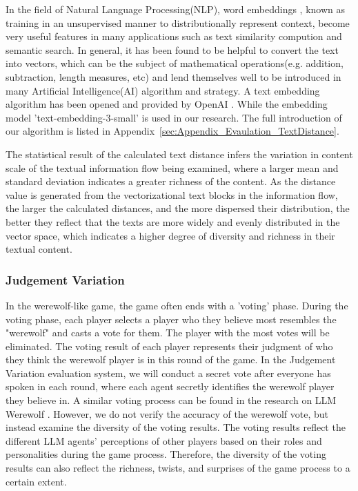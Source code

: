 \documentclass[11pt]{article}
\begin{document}
In the field of Natural Language Processing(NLP), word embeddings \citep{turian2010word,mikolov2013efficient}, known as training in an unsupervised manner to distributionally represent context, become very useful features in many applications such as text similarity compution and semantic search. In general, it has been found to be helpful to convert the text into vectors, which can be the subject of mathematical operations(e.g. addition, subtraction, length measures, etc) and lend themselves well to be introduced in many Artificial Intelligence(AI) algorithm and strategy. A text embedding algorithm has been opened and provided by OpenAI \citep{neelakantan2022text}. While the embedding model 'text-embedding-3-small' is used in our research. The full introduction of our algorithm is listed in Appendix~\ref{sec:Appendix_Evaulation_TextDistance}.

The statistical result of the calculated text distance infers the variation in content scale of the textual information flow being examined, where a larger mean and standard deviation indicates a greater richness of the content. As the distance value is generated from the vectorizational text blocks in the information flow, the larger the calculated distances, and the more dispersed their distribution, the better they reflect that the texts are more widely and evenly distributed in the vector space, which indicates a higher degree of diversity and richness in their textual content. 

\subsubsection{Judgement Variation}

In the werewolf-like game, the game often ends with a 'voting' phase. During the voting phase, each player selects a player who they believe most resembles the "werewolf" and casts a vote for them. The player with the most votes will be eliminated. The voting result of each player represents their judgment of who they think the werewolf player is in this round of the game.
In the Judgement Variation evaluation system, we will conduct a secret vote after everyone has spoken in each round, where each agent secretly identifies the werewolf player they believe in. A similar voting process can be found in the research on LLM Werewolf \citep{jin2024learning,xu2023exploring}. However, we do not verify the accuracy of the werewolf vote, but instead examine the diversity of the voting results. The voting results reflect the different LLM agents' perceptions of other players based on their roles and personalities during the game process. Therefore, the diversity of the voting results can also reflect the richness, twists, and surprises of the game process to a certain extent.
\end{document}
